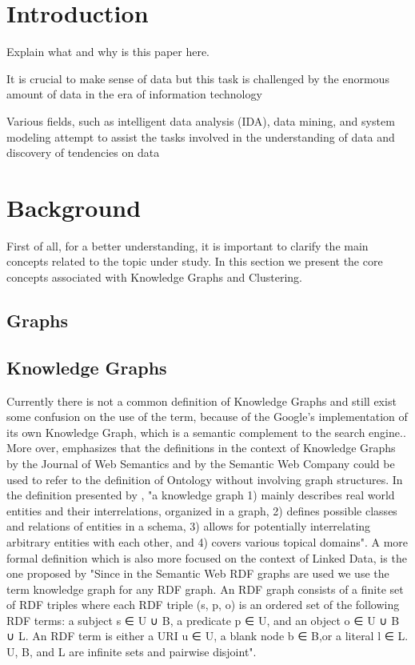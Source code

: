 \documentclass[runningheads]{llncs}
\begin{document}
\section{Introduction}
Explain what and why is this paper here.

It is crucial to make sense of data but this task is challenged by the enormous amount of data in the era of information technology \cite{Pedrycz}

Various fields, such as intelligent data analysis (IDA), data mining, and system modeling attempt to assist the tasks involved in the understanding of data and discovery of tendencies on data \cite{Pedrycz}


\section{Background}
First of all, for a better understanding, it is important to clarify the main concepts related to the topic under study. In this section we present the core concepts associated with Knowledge Graphs and Clustering.
\subsection{Graphs}
\subsection{Knowledge Graphs}
Currently there is not a common definition of Knowledge Graphs and still exist some confusion on the use of the term, because of the Google's implementation of its own Knowledge Graph, which is a semantic complement to the search engine.\cite{Ehrlinger}. More over, \cite{Ehrlinger} emphasizes that the definitions in the context of Knowledge Graphs by the Journal of Web Semantics and by the Semantic Web Company could be used to refer to the definition of Ontology without involving graph structures. 
In the definition presented by \cite{Paulheim}, "a knowledge graph
1) mainly describes real world entities and their interrelations, organized in a graph, 2) defines possible classes and relations of entities in a schema, 3) allows for potentially interrelating arbitrary entities with each other, and 4) covers various topical domains". A more formal definition which is also more focused on the context of Linked Data, is the one proposed by \cite{Farber} "Since in the Semantic Web RDF graphs are used we use the term knowledge graph for any RDF graph. An RDF graph consists of a finite set of RDF triples where each RDF triple (s, p, o) is an ordered set of the following RDF terms: a subject s ∈ U ∪ B, a predicate p ∈ U, and an object o ∈ U ∪ B ∪ L. An RDF term is either a URI u ∈ U, a blank node b ∈ B,or a literal l ∈ L. U, B, and L are infinite sets and pairwise disjoint".
\end{document}
